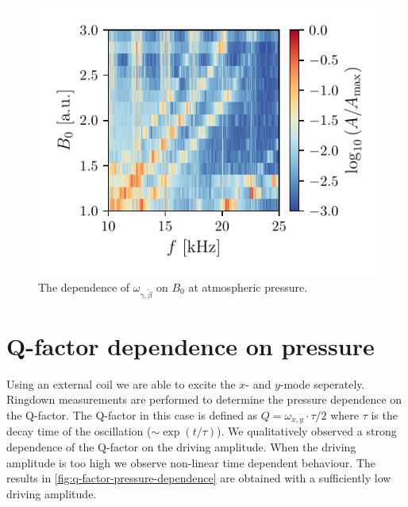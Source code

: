 \begin{figure}
    \centering
    \includegraphics{figures/data/rotational_mode_dependence_on_B0.pdf}
    \caption{The dependence of $\omega_{\gamma,\tilde\beta}$ on $B_0$ at atmospheric pressure.}
    \label{fig:rotational-mode-dependence-1bar}
\end{figure}

\section{Q-factor dependence on pressure}
\label{sec:q-factor-dependence-on-pressure}
Using an external coil we are able to excite the $x$- and $y$-mode seperately. Ringdown measurements are performed to determine the pressure dependence on the Q-factor. The Q-factor in this case is defined as $Q = \omega_{x,y} \cdot \tau / 2$ where $\tau$ is the decay time of the oscillation ($\sim \exp\left(t / \tau\right)$). We qualitatively observed a strong dependence of the Q-factor on the driving amplitude. When the driving amplitude is too high we observe non-linear time dependent behaviour. The results in \autoref{fig:q-factor-pressure-dependence} are obtained with a sufficiently low driving amplitude.

